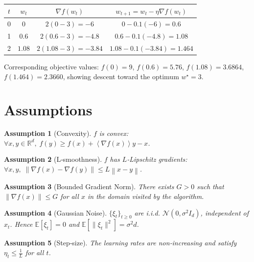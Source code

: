 \documentclass{article}
\newtheorem{assumption}{Assumption}
\newcommand{\EE}{\mathbb{E}}
\newcommand{\RR}{\mathbb{R}}
\newcommand{\norm}[1]{\left\|#1\right\|}
\newcommand{\inner}[1]{\left\langle #1 \right\rangle}
\begin{document}
\begin{center}
\begin{tabular}{c|c|c|c}
$t$ & $w_t$ & $\nabla f(w_t)$ & $w_{t+1}=w_t-\eta\nabla f(w_t)$ \\ \hline
0 & $0$ & $2(0-3)=-6$ & $0-0.1(-6)=0.6$ \\
1 & $0.6$ & $2(0.6-3)=-4.8$ & $0.6-0.1(-4.8)=1.08$ \\
2 & $1.08$ & $2(1.08-3)=-3.84$ & $1.08-0.1(-3.84)=1.464$ \\
\end{tabular}
\end{center}

Corresponding objective values: $f(0)=9$, $f(0.6)=5.76$, $f(1.08)=3.6864$, $f(1.464)=2.3660$,
showing descent toward the optimum $w^\star=3$.

\section*{Assumptions}
\begin{assumption}[Convexity]\label{as:convex}
$f$ is convex: $\forall x,y\in\RR^d,\; f(y)\ge f(x)+\inner{\nabla f(x)}{y-x}$.
\end{assumption}
\begin{assumption}[L‑smoothness]\label{as:smooth}
$f$ has $L$‑Lipschitz gradients: $\forall x,y,\;
\norm{\nabla f(x)-\nabla f(y)}\le L\norm{x-y}$.
\end{assumption}
\begin{assumption}[Bounded Gradient Norm]\label{as:bound}
There exists $G>0$ such that $\norm{\nabla f(x)}\le G$ for all $x$ in the domain visited by the algorithm.
\end{assumption}
\begin{assumption}[Gaussian Noise]\label{as:noise}
$\{\xi_t\}_{t\ge0}$ are i.i.d. $\mathcal N(0,\sigma^2 I_d)$, independent of $x_t$.
Hence $\EE[\xi_t]=0$ and $\EE[\|\xi_t\|^2]=\sigma^2 d$.
\end{assumption}
\begin{assumption}[Step‑size]\label{as:stepsize}
The learning rates are non‑increasing and satisfy $\eta_t\le \frac{1}{L}$ for all $t$.
\end{assumption}
\end{document}
